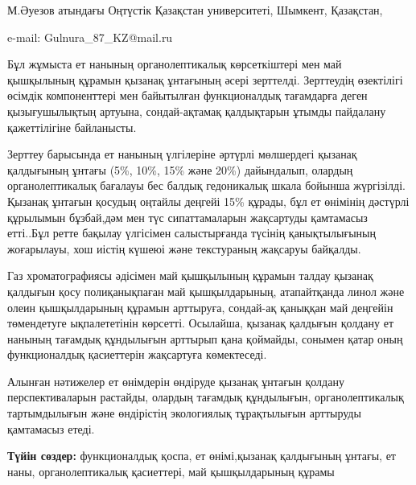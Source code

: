 \begin{affiliation}
М.Әуезов атындағы Оңтүстік Қазақстан университеті, Шымкент, Қазақстан,

e-mail: Gulnura\_87\_KZ@mail.ru
\end{affiliation}

Бұл жұмыста ет нанының органолептикалық көрсеткіштері мен май қышқылының
құрамын қызанақ ұнтағының әсері зерттелді. Зерттеудің өзектілігі өсімдік
компоненттері мен байытылған функционалдық тағамдарға деген
қызығушылықтың артуына, сондай-ақтамақ қалдықтарын ұтымды пайдалану
қажеттілігіне байланысты.

Зерттеу барысында ет нанының үлгілеріне әртүрлі мөлшердегі қызанақ
қалдығының ұнтағы (5\%, 10\%, 15\% және 20\%) дайындалып, олардың
органолептикалық бағалауы бес балдық гедоникалық шкала бойынша
жүргізілді. Қызанақ ұнтағын қосудың оңтайлы деңгейі 15\% құрады, бұл ет
өнімінің дәстүрлі құрылымын бұзбай,дәм мен түс сипаттамаларын жақсартуды
қамтамасыз етті..Бұл ретте бақылау үлгісімен салыстырғанда түсінің
қанықтылығының жоғарылауы, хош иістің күшеюі және текстураның жақсаруы
байқалды.

Газ хроматографиясы әдісімен май қышқылының құрамын талдау қызанақ
қалдығын қосу полиқанықпаған май қышқылдарының, атапайтқанда линол және
олеин қышқылдарының құрамын арттыруға, сондай-ақ қаныққан май деңгейін
төмендетуге ықпалететінін көрсетті. Осылайша, қызанақ қалдығын қолдану
ет нанының тағамдық құндылығын арттырып қана қоймайды, сонымен қатар
оның функционалдық қасиеттерін жақсартуға көмектеседі.

Алынған нәтижелер ет өнімдерін өндіруде қызанақ ұнтағын қолдану
перспективаларын растайды, олардың тағамдық құндылығын, органолептикалық
тартымдылығын және өндірістің экологиялық тұрақтылығын арттыруды
қамтамасыз етеді.

{\bfseries Түйін сөздер:} функционалдық қоспа, ет өнімі,қызанақ қалдығының
ұнтағы, ет наны, органолептикалық қасиеттері, май қышқылдарының құрамы

